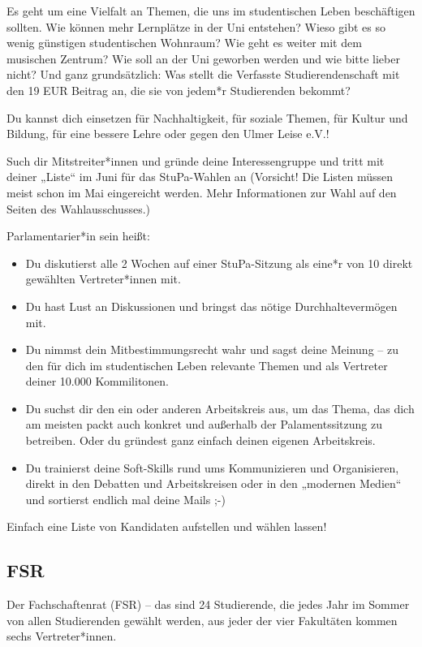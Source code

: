 \documentclass[
	10pt,
	a5paper,
	twoside
	]
	{book}
\begin{document}
Es geht um eine Vielfalt an Themen, die uns im studentischen Leben beschäftigen sollten. Wie können mehr Lernplätze in der Uni entstehen? Wieso gibt es so wenig günstigen studentischen Wohnraum? Wie geht es weiter mit dem musischen Zentrum? Wie soll an der Uni geworben werden und wie bitte lieber nicht? Und ganz grundsätzlich: Was stellt die Verfasste Studierendenschaft mit den 19 EUR Beitrag an, die sie von jedem*r Studierenden bekommt?

Du kannst dich einsetzen für Nachhaltigkeit, für soziale Themen, für Kultur und Bildung, für eine bessere Lehre oder gegen den Ulmer Leise e.V.!

Such dir Mitstreiter*innen und gründe deine Interessengruppe und tritt mit deiner „Liste“ im Juni für das StuPa-Wahlen an (Vorsicht! Die Listen müssen meist schon im Mai eingereicht werden. Mehr Informationen zur Wahl auf den Seiten des Wahlausschusses.)

Parlamentarier*in sein heißt:

\begin{itemize}
	\item Du diskutierst alle 2 Wochen auf einer StuPa-Sitzung als eine*r von 10 direkt gewählten Vertreter*innen mit.
	\item Du hast Lust an Diskussionen und bringst das nötige Durchhaltevermögen mit.
	\item Du nimmst dein Mitbestimmungsrecht wahr und sagst deine Meinung – zu den für dich im studentischen Leben relevante Themen und als Vertreter deiner 10.000 Kommilitonen.
	\item Du suchst dir den ein oder anderen Arbeitskreis aus, um das Thema, das dich am meisten packt auch konkret und außerhalb der Palamentssitzung zu betreiben. Oder du gründest ganz einfach deinen eigenen Arbeitskreis.
	\item Du trainierst deine Soft-Skills rund ums Kommunizieren und Organisieren, direkt in den Debatten und Arbeitskreisen oder in den „modernen Medien“ und sortierst endlich mal deine Mails ;-)
\end{itemize}

Einfach eine Liste von Kandidaten aufstellen und wählen lassen!



\subsection{FSR}

Der Fachschaftenrat (FSR) – das sind 24 Studierende, die jedes Jahr im Sommer von allen Studierenden gewählt werden, aus jeder der vier Fakultäten kommen sechs Vertreter*innen.
\end{document}
